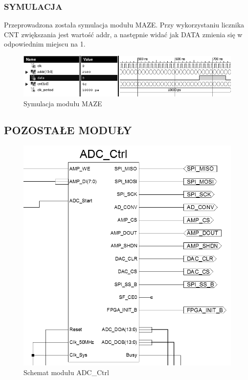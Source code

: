 \documentclass[11pt]{article}
\begin{document}
\subsubsection{SYMULACJA}
Przeprowadzona została symulacja modułu MAZE. 
Przy wykorzystaniu licznika CNT zwiększania jest wartość addr, a następnie widać jak DATA zmienia się w odpowiednim miejscu na 1.
\begin{figure}[H]
\center
\includegraphics[scale=.7]{maze_test.png}
\caption{Symulacja modułu MAZE}
\end{figure}

\subsection{POZOSTAŁE MODUŁY}

\begin{figure}[H]
\centering
\includegraphics[scale=.5]{ADC_Ctrl.PNG}
\caption{Schemat modułu ADC\_Ctrl}
\end{figure}
\end{document}
